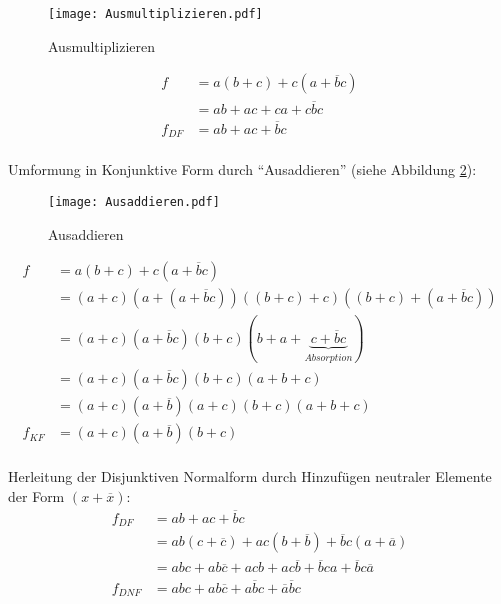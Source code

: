 \begin{figure}[htbp] %
	\centering
	\texttt{[image: Ausmultiplizieren.pdf]}
	\caption{Ausmultiplizieren}
	\label{Ausmultiplizieren}
\end{figure}
\begin{align*}
				  f &= a(b + c) + c(a + \overline{b}c) \\
					&= ab + ac + ca + c\overline{b}c   \\
	f_{\textit{DF}} &= ab + ac + \overline{b}c    \\
\end{align*}

Umformung in Konjunktive Form durch "`Ausaddieren"' (siehe Abbildung \ref{Ausaddieren}):

\begin{figure}[htbp] %
	\centering
	\texttt{[image: Ausaddieren.pdf]}
	\caption{Ausaddieren}
	\label{Ausaddieren}
\end{figure}

\begin{align*}
				  f &= a(b + c) + c(a + \overline{b}c)                \\
					&= (a + c) (a + (a + \overline{b}c))
						((b + c) + c) ((b + c) + (a + \overline{b}c)) \\
	                &= (a + c) (a + \overline{b}c)
					   (b + c) (b + a 
					   + \underbrace{c + \overline{b}c}_{Absorption}) \\
	                &= (a + c) (a + \overline{b}c) (b + c) (a + b + c) \\
	                &= (a + c) (a + \overline{b}) (a + c) 
	                   (b + c) (a + b + c) \\
	f_{\textit{KF}} &= (a + c) (a + \overline{b}) (b + c) \\
\end{align*}

Herleitung der Disjunktiven Normalform durch Hinzufügen neutraler Elemente der Form $(x + \overline{x})$:
\begin{align*}
	f_{\textit{DF}} &= ab + ac + \overline{b}c    \\
	                &= ab(c + \overline{c})
	                 + ac(b + \overline{b})
	                 + \overline{b}c(a + \overline{a})    \\
	                &= abc + ab\overline{c}
	                 + acb + ac\overline{b}
	                 + \overline{b}ca + \overline{b}c\overline{a}    \\
	f_{\textit{DNF}} &= abc + ab\overline{c} + a\overline{b}c
	                  + \overline{a}\overline{b}c    \\
\end{align*}

